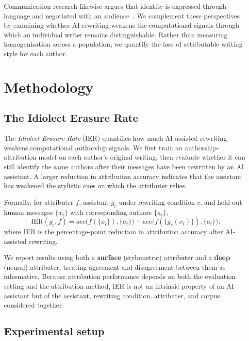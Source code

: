 \documentclass[sigconf,nonacm]{acmart}
\begin{document}
Communication research likewise argues that identity is expressed through language
and negotiated with an audience~\cite{goffman1959,ellison2012,hwang2025}. We
complement these perspectives by examining whether AI rewriting weakens the
computational signals through which an individual writer remains distinguishable.
Rather than measuring homogenization across a population, we quantify the loss of
attributable writing style for each author.

\section{Methodology}
\vspace{4pt}
\subsection{The Idiolect Erasure Rate}

The \emph{Idiolect Erasure Rate} (IER) quantifies how much AI-assisted rewriting
weakens computational authorship signals. We first train an authorship-attribution
model on each author's original writing, then evaluate whether it can still
identify the same authors after their messages have been rewritten by an AI
assistant. A larger reduction in attribution accuracy indicates that the assistant
has weakened the stylistic cues on which the attributer relies.

Formally, for attributer $f$, assistant $g_c$ under rewriting condition $c$, and
held-out human messages $\{x_i\}$ with corresponding authors $\{a_i\}$,
\[
\mathrm{IER}(g_c,f)=
\mathrm{acc}\!\big(f(\{x_i\}),\{a_i\}\big)
-
\mathrm{acc}\!\big(f(\{g_c(x_i)\}),\{a_i\}\big),
\]
where IER is the percentage-point reduction in attribution accuracy after
AI-assisted rewriting.

We report results using both a \textbf{surface} (stylometric) attributer and a
\textbf{deep} (neural) attributer, treating agreement and disagreement between them
as informative. Because attribution performance depends on both the evaluation
setting and the attribution method, IER is not an intrinsic property of an AI
assistant but of the assistant, rewriting condition, attributer, and corpus
considered together.

\subsection{Experimental setup}
\end{document}
